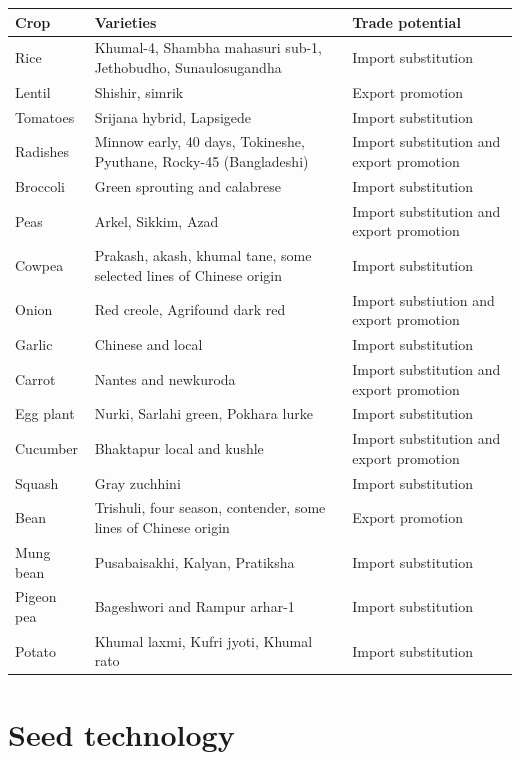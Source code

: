 \documentclass[
  openany]{book}
\begin{document}
\begin{longtable}{>{\raggedright\arraybackslash}p{6em}>{\raggedright\arraybackslash}p{18em}>{\raggedright\arraybackslash}p{12em}}
\toprule
Crop & Varieties & Trade potential\\
\midrule
Rice & Khumal-4, Shambha mahasuri sub-1, Jethobudho, Sunaulosugandha & Import substitution\\
Lentil & Shishir, simrik & Export promotion\\
Tomatoes & Srijana hybrid, Lapsigede & Import substitution\\
Radishes & Minnow early, 40 days, Tokineshe, Pyuthane, Rocky-45 (Bangladeshi) & Import substitution and export promotion\\
Broccoli & Green sprouting and calabrese & Import substitution\\
\addlinespace
Peas & Arkel, Sikkim, Azad & Import substitution and export promotion\\
Cowpea & Prakash, akash, khumal tane, some selected lines of Chinese origin & Import substitution\\
Onion & Red creole, Agrifound dark red & Import substiution and export promotion\\
Garlic & Chinese and local & Import substitution\\
Carrot & Nantes and newkuroda & Import substitution and export promotion\\
\addlinespace
Egg plant & Nurki, Sarlahi green, Pokhara lurke & Import substitution\\
Cucumber & Bhaktapur local and kushle & Import substitution and export promotion\\
Squash & Gray zuchhini & Import substitution\\
Bean & Trishuli, four season, contender, some lines of Chinese origin & Export promotion\\
Mung bean & Pusabaisakhi, Kalyan, Pratiksha & Import substitution\\
\addlinespace
Pigeon pea & Bageshwori and Rampur arhar-1 & Import substitution\\
Potato & Khumal laxmi, Kufri jyoti, Khumal rato & Import substitution\\
\bottomrule
\end{longtable}

\hypertarget{seed-technology}{%
\section{Seed technology}\label{seed-technology}}
\end{document}

